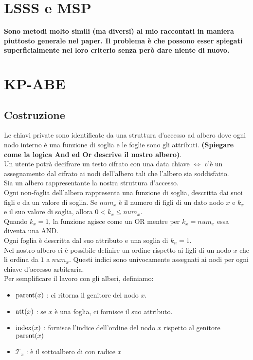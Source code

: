 \section{LSSS e MSP}

\textbf{Sono metodi molto simili (ma diversi) al mio raccontati in maniera piuttosto generale nel paper. Il problema è che possono esser spiegati superficialmente nel loro criterio senza però dare niente di nuovo.}

\section{KP-ABE}

\subsection{Costruzione} 

Le chiavi private sono identificate da una struttura d'accesso ad albero dove ogni nodo interno è una funzione di soglia e le foglie sono gli attributi. \textbf{(Spiegare come la logica And ed Or descrive il nostro albero)}.\\
Un utente potrà decifrare un testo cifrato con una data chiave $\Leftrightarrow$ c'è un assegnamento dal cifrato ai nodi dell'albero tali che l'albero sia soddisfatto.\\[1cm]

Sia  un albero rappresentante la nostra struttura d'accesso.\\
Ogni non-foglia dell'albero rappresenta una funzione di soglia, descritta dai suoi figli e da un valore di soglia. Se $num_x$ è il numero di figli di un dato nodo $x$ e $k_x$ e il suo valore di soglia, allora $0 < k_x \leq num_x$.\\
Quando $k_x = 1$, la funzione agisce come un OR mentre per $k_x = num_x$ essa diventa una AND.\\
Ogni foglia è descritta dal suo attributo e una soglia di $k_n = 1$.\\
Nel nostro albero ci è possibile definire un ordine rispetto ai figli di un nodo $x$ che li ordina da $1$ a $num_x$. Questi indici sono univocamente assegnati ai nodi per ogni chiave d'accesso arbitraria.
\\[0.5cm]

Per semplificare il lavoro con gli alberi, definiamo:
\begin{itemize}
\item $\operatorname{parent}(x)$ : ci ritorna il genitore del nodo $x$.
\item $\operatorname{att}(x)$ : se $x$ è una foglia, ci fornisce il suo attributo.
\item $\operatorname{index}(x)$ : fornisce l'indice dell'ordine del nodo $x$ rispetto al genitore $\operatorname{parent}(x)$
\item $\mathcal{T}_x$ : è il sottoalbero di  con radice $x$ 
\end{itemize}

